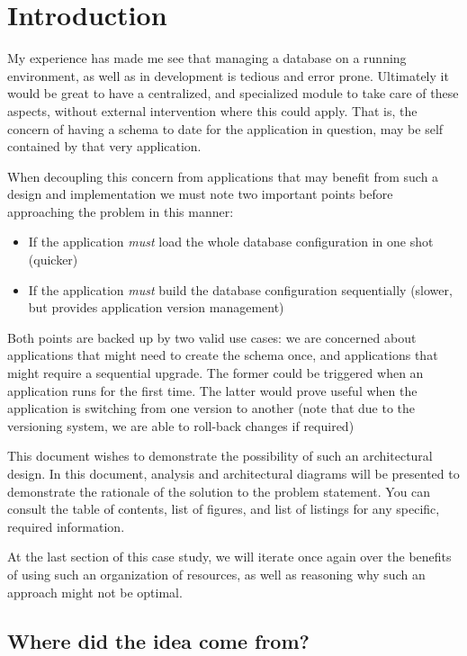 \section{Introduction}

My experience has made me see that managing a database on a running
environment, as well as in development is tedious and error prone.  Ultimately
it would be great to have a centralized, and specialized module to take care of
these aspects, without external intervention where this could apply. That is,
the concern of having a schema to date for the application in question, may be
self contained by that very application.

When decoupling this concern from applications that may benefit from such a
design and implementation we must note two important points before approaching
the problem in this manner:

\begin{itemize}
\item
If the application \textit{must} load the whole database configuration in one
shot (quicker)
\item
If the application \textit{must} build the database configuration sequentially
(slower, but provides application version management)
\end{itemize}

Both points are backed up by two valid use cases: we are concerned about
applications that might need to create the schema once, and applications that
might require a sequential upgrade. The former could be triggered when an
application runs for the first time. The latter would prove useful when the
application is switching from one version to another (note that due to the
versioning system, we are able to roll-back changes if required)

This document wishes to demonstrate the possibility of such an architectural
design. In this document, analysis and architectural diagrams will be presented
to demonstrate the rationale of the solution to the problem statement. You can
consult the table of contents, list of figures, and list of listings for any
specific, required information. 

At the last section of this case study, we will iterate once again over the
benefits of using such an organization of resources, as well as reasoning why
such an approach might not be optimal.

\subsection{Where did the idea come from?}

